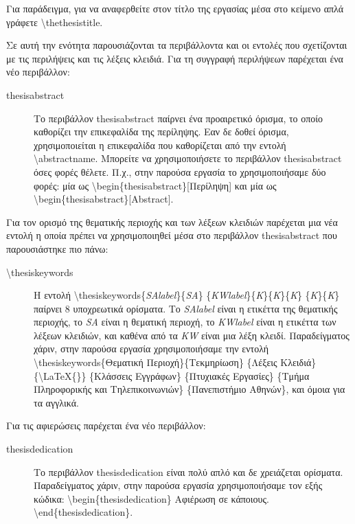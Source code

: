\documentclass{dithesis}
\begin{document}
Για παράδειγμα, για να αναφερθείτε στον τίτλο της εργασίας μέσα στο κείμενο
απλά γράφετε \textbackslash{thethesistitle}.

Σε αυτή την ενότητα παρουσιάζονται τα περιβάλλοντα και οι εντολές που 
σχετίζονται με τις περιλήψεις και τις λέξεις κλειδιά.
Για τη συγγραφή περιλήψεων παρέχεται ένα νέο περιβάλλον:
\begin{description}
\item[thesisabstract]
  Το περιβάλλον thesisabstract παίρνει ένα προαιρετικό όρισμα, το οποίο 
  καθορίζει την επικεφαλίδα της περίληψης.
  Εαν δε δοθεί όρισμα, χρησιμοποιείται η επικεφαλίδα που καθορίζεται από
  την εντολή \textbackslash{abstractname}.
  Μπορείτε να χρησιμοποιήσετε το περιβάλλον thesisabstract όσες φορές θέλετε.
  Π.χ., στην παρούσα εργασία το χρησιμοποιήσαμε δύο φορές:
  μία ως \textbackslash{begin}\{thesisabstract\}{[}Περίληψη{]} και μία
  ως \textbackslash{begin}\{thesisabstract\}{[Abstract]}.
\end{description}
Για τον ορισμό της θεματικής περιοχής και των λέξεων κλειδιών παρέχεται μια
νέα εντολή η οποία πρέπει να χρησιμοποιηθεί μέσα στο περιβάλλον thesisabstract
που παρουσιάστηκε πιο πάνω:
\begin{description}
\item[\textbackslash{thesiskeywords}]
  Η εντολή \textbackslash{thesiskeywords}\{\textit{SAlabel}\}\{\textit{SA}\}%
  \{\textit{KWlabel}\}\{\textit{K}\}\{\textit{K}\}\{\textit{K}\}%
  \{\textit{K}\}\{\textit{K}\} παίρνει 8 υποχρεωτικά ορίσματα.
  Το \textit{SAlabel} είναι η ετικέττα της θεματικής περιοχής,
  το \textit{SA} είναι η θεματική περιοχή, το \textit{KWlabel} είναι
  η ετικέττα των λέξεων κλειδιών, και καθένα από τα \textit{KW} είναι μια λέξη
  κλειδί.
  Παραδείγματος χάριν, στην παρούσα εργασία χρησιμοποιήσαμε την εντολή
  \textbackslash{thesiskeywords}\{Θεματική Περιοχή\}\{Τεκμηρίωση\}
  \{Λέξεις Κλειδιά\} \{\textbackslash{LaTeX}\{\}\} \{Κλάσσεις Εγγράφων\}
  \{Πτυχιακές Εργασίες\} \{Τμήμα Πληροφορικής και Τηλεπικοινωνιών\}
  \{Πανεπιστήμιο Αθηνών\}, και όμοια για τα αγγλικά.
\end{description}

Για τις αφιερώσεις παρέχεται ένα νέο περιβάλλον:
\begin{description}
\item[thesisdedication]
  Το περιβάλλον thesisdedication είναι πολύ απλό και δε χρειάζεται ορίσματα.
  Παραδείγματος χάριν, στην παρούσα εργασία χρησιμοποιήσαμε τον εξής κώδικα:
  \textbackslash{begin}\{thesisdedication\} Αφιέρωση σε κάποιους.
  \textbackslash{end}\{thesisdedication\}.
\end{description}
\end{document}
